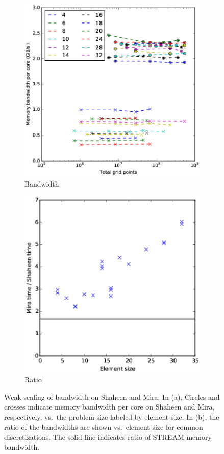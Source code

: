 \begin{figure}
\begin{subfigure}[t]{0.49\textwidth}
\includegraphics[width=\textwidth]{gfx/combined-bw}
\caption{Bandwidth}
\end{subfigure}
\begin{subfigure}[t]{0.49\textwidth}
\includegraphics[width=\textwidth]{gfx/mira_vs_haswell}
\caption{Ratio}
\end{subfigure}
\caption{ 
Weak scaling of bandwidth on Shaheen and Mira.
In (a), Circles and crosses indicate memory bandwidth per core on Shaheen and Mira, respectively, vs.\ the problem size labeled by element size.
In (b), the ratio of the bandwidths are shown vs.\ element size for common discretizations.
The solid line indicates ratio of STREAM memory bandwidth.
}

\end{figure}

